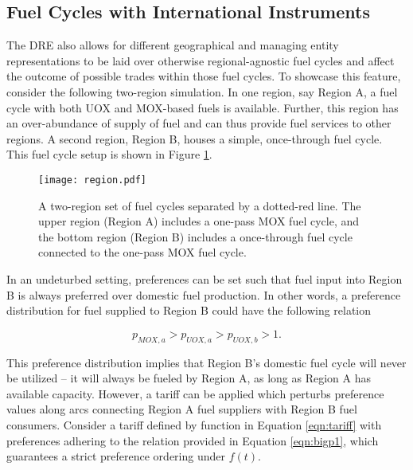 

\subsection{Fuel Cycles with International Instruments}

The DRE also allows for different geographical and managing entity
representations to be laid over otherwise regional-agnostic fuel cycles and
affect the outcome of possible trades within those fuel cycles. To showcase this
feature, consider the following two-region simulation. In one region, say Region
A, a fuel cycle with both UOX and MOX-based fuels is available. Further, this
region has an over-abundance of supply of fuel and can thus provide fuel
services to other regions. A second region, Region B, houses a simple,
once-through fuel cycle. This fuel cycle setup is shown in Figure
\ref{fig:region}.

\begin{figure}
  \begin{center}
    \texttt{[image: region.pdf]}
    \caption[]{
      \label{fig:region}
      A two-region set of fuel cycles separated by a dotted-red line. The upper
      region (Region A) includes a one-pass MOX fuel cycle, and the bottom
      region (Region B) includes a once-through fuel cycle connected to the
      one-pass MOX fuel cycle.}
  \end{center}
\end{figure}

In an undeturbed setting, preferences can be set such that fuel input into
Region B is always preferred over domestic fuel production. In other words, a
preference distribution for fuel supplied to Region B could have the following
relation

\begin{equation}\label{eqn:bigdefault}
  p_{MOX, a} > p_{UOX, a} > p_{UOX, b} > 1.
\end{equation}

\noindent
This preference distribution implies that Region B's domestic fuel cycle will
never be utilized -- it will always be fueled by Region A, as long as Region A
has available capacity. However, a tariff can be applied which perturbs
preference values along arcs connecting Region A fuel suppliers with Region B
fuel consumers. Consider a tariff defined by function in Equation
\ref{eqn:tariff} with preferences adhering to the relation provided in Equation
\ref{eqn:bigp1}, which guarantees a strict preference ordering under $f(t)$.

